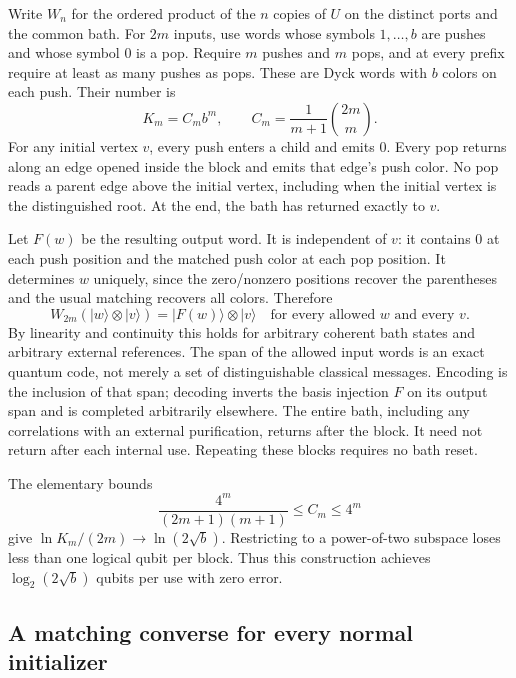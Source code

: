 \documentclass[11pt]{article}
\theoremstyle{definition}\newtheorem{definition}[theorem]{Definition}
\newcommand{\ket}[1]{\lvert #1\rangle}
\begin{document}
Write $W_n$ for the ordered product of the $n$ copies of $U$ on the distinct ports and the common bath. For $2m$ inputs, use words whose symbols $1,\ldots,b$ are pushes and whose symbol $0$ is a pop. Require $m$ pushes and $m$ pops, and at every prefix require at least as many pushes as pops. These are Dyck words with $b$ colors on each push. Their number is
\begin{equation}
 K_m=C_m b^m,\qquad C_m=\frac1{m+1}\binom{2m}{m}.\label{eq:dyckcount}
\end{equation}
For any initial vertex $v$, every push enters a child and emits $0$. Every pop returns along an edge opened inside the block and emits that edge's push color. No pop reads a parent edge above the initial vertex, including when the initial vertex is the distinguished root. At the end, the bath has returned exactly to $v$.

Let $F(w)$ be the resulting output word. It is independent of $v$: it contains $0$ at each push position and the matched push color at each pop position. It determines $w$ uniquely, since the zero/nonzero positions recover the parentheses and the usual matching recovers all colors. Therefore
\begin{equation}
 W_{2m}(\ket w\otimes\ket v)=\ket{F(w)}\otimes\ket v
 \quad\text{for every allowed }w\text{ and every }v.\label{eq:dyckmap}
\end{equation}
By linearity and continuity this holds for arbitrary coherent bath states and arbitrary external references. The span of the allowed input words is an exact quantum code, not merely a set of distinguishable classical messages. Encoding is the inclusion of that span; decoding inverts the basis injection $F$ on its output span and is completed arbitrarily elsewhere. The entire bath, including any correlations with an external purification, returns after the block. It need not return after each internal use. Repeating these blocks requires no bath reset.

The elementary bounds
\[
 \frac{4^m}{(2m+1)(m+1)}\le C_m\le4^m
\]
give $\ln K_m/(2m)\to\ln(2\sqrt b)$. Restricting to a power-of-two subspace loses less than one logical qubit per block. Thus this construction achieves $\log_2(2\sqrt b)$ qubits per use with zero error.

\subsection{A matching converse for every normal initializer}
\end{document}
